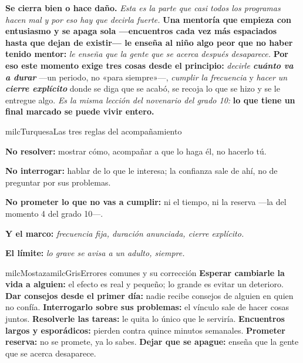 \documentclass[11pt,letterpaper]{article}
\newcommand{\milcpaso}[3]{%
\Needspace{4\baselineskip}%
\begin{tcolorbox}[enhanced,colback=white,colframe=milcLinea,arc=1.5mm,boxrule=.9pt,
  left=14mm,right=4mm,top=3mm,bottom=3mm,before skip=4pt,after skip=4pt,
  fontupper=\RaggedRight,
  overlay={\node[anchor=north west,circle,fill=#2,text=white,inner sep=0pt,
    minimum size=7.4mm,font=\sffamily\bfseries\small]
    at ([xshift=3.6mm,yshift=-3.2mm]frame.north west) {#1};}]
#3
\end{tcolorbox}}
\begin{document}
\milcpaso{4}{milcTurquesa}{\textbf{Se cierra bien o hace daño.} \emph{Esta es la parte que casi todos los programas hacen mal y por eso hay que decirla fuerte.} \textbf{Una mentoría que empieza con entusiasmo y se apaga sola ---encuentros cada vez más espaciados hasta que dejan de existir--- le enseña al niño algo peor que no haber tenido mentor:} \emph{le enseña que la gente que se acerca después desaparece.} \textbf{Por eso este momento exige tres cosas desde el principio:} \emph{decirle \textbf{cuánto va a durar}} ---un periodo, no «para siempre»---, \emph{cumplir la frecuencia} y \emph{hacer un \textbf{cierre explícito}} donde se diga que se acabó, se recoja lo que se hizo y se le entregue algo. \emph{Es la misma lección del novenario del grado 10:} \textbf{lo que tiene un final marcado se puede vivir entero.}}

\begin{drawbox}{milcTurquesa}{Las tres reglas del acompañamiento}
\begin{pasoslista}
\item \textbf{No resolver:} mostrar cómo, acompañar a que lo haga él, no hacerlo tú.
\item \textbf{No interrogar:} hablar de lo que le interesa; la confianza sale de ahí, no de preguntar por sus problemas.
\item \textbf{No prometer lo que no vas a cumplir:} ni el tiempo, ni la reserva ---la del momento 4 del grado 10---.
\item \textbf{Y el marco:} \emph{frecuencia fija, duración anunciada, cierre explícito.}
\item \textbf{El límite:} \emph{lo grave se avisa a un adulto, siempre.}
\end{pasoslista}
\end{drawbox}

\begin{softbox}{milcMostaza}{milcGris}{Errores comunes y su corrección}
\textbf{Esperar cambiarle la vida a alguien:} el efecto es real y pequeño; lo grande es evitar un deterioro. \textbf{Dar consejos desde el primer día:} nadie recibe consejos de alguien en quien no confía. \textbf{Interrogarlo sobre sus problemas:} el vínculo sale de hacer cosas juntos. \textbf{Resolverle las tareas:} le quita lo único que le serviría. \textbf{Encuentros largos y esporádicos:} pierden contra quince minutos semanales. \textbf{Prometer reserva:} no se promete, ya lo sabes. \textbf{Dejar que se apague:} enseña que la gente que se acerca desaparece.
\end{softbox}
\end{document}
